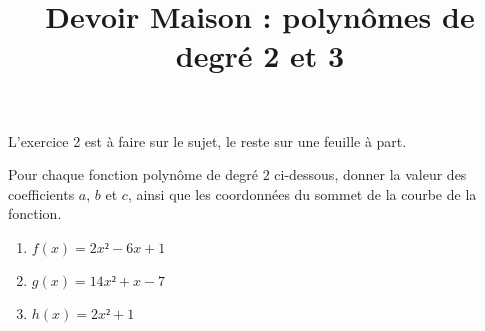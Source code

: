 \documentclass[
	classe=$1^{ere}STI2D$,
	headerTitle=Devoir\space maison
]{évaluation}
\begin{document}
\title{Devoir Maison : polynômes de degré 2 et 3}
\maketitle

\begin{tcolorbox}
	L'exercice 2 est à faire sur le sujet, le reste sur une feuille à part.
\end{tcolorbox}

\begin{exercice}
	Pour chaque fonction polynôme de degré $2$ ci-dessous, donner la valeur des coefficients $a$, $b$ et $c$, ainsi que les coordonnées du sommet de la courbe de la fonction.
	\begin{enumerate}
		\item $f(x) = 2x² - 6x + 1$
		\item $g(x) = 14x² + x - 7$
		\item $h(x) = 2x² + 1$
	\end{enumerate}
\end{exercice}
\end{document}
